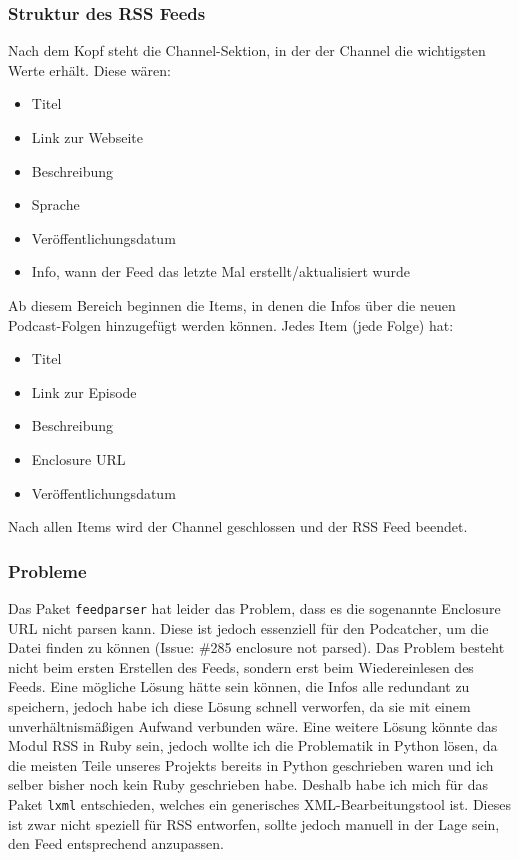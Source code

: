 \documentclass{article}
\begin{document}
\subsubsection{Struktur des RSS Feeds}
Nach dem Kopf steht die Channel-Sektion, in der der Channel die wichtigsten Werte erhält. Diese wären:
\begin{itemize}
    \item Titel
    \item Link zur Webseite
    \item Beschreibung
    \item Sprache
    \item Veröffentlichungsdatum
    \item Info, wann der Feed das letzte Mal erstellt/aktualisiert wurde
\end{itemize}

Ab diesem Bereich beginnen die Items, in denen die Infos über die neuen Podcast-Folgen hinzugefügt werden können. Jedes Item (jede Folge) hat:

\begin{itemize}
    \item Titel
    \item Link zur Episode
    \item Beschreibung
    \item Enclosure URL
    \item Veröffentlichungsdatum
\end{itemize}

Nach allen Items wird der Channel geschlossen und der RSS Feed beendet.

\subsubsection{Probleme}
Das Paket \texttt{feedparser} \cite{feedparser} hat leider das Problem, dass es die sogenannte Enclosure URL nicht parsen kann. Diese ist jedoch essenziell für den Podcatcher, um die Datei finden zu können (Issue: \#285 enclosure not parsed). Das Problem besteht nicht beim ersten Erstellen des Feeds, sondern erst beim Wiedereinlesen des Feeds. Eine mögliche Lösung hätte sein können, die Infos alle redundant zu speichern, jedoch habe ich diese Lösung schnell verworfen, da sie mit einem unverhältnismäßigen Aufwand verbunden wäre. Eine weitere Lösung könnte das Modul RSS in Ruby sein, jedoch wollte ich die Problematik in Python lösen, da die meisten Teile unseres Projekts bereits in Python geschrieben waren und ich selber bisher noch kein Ruby geschrieben habe.
Deshalb habe ich mich für das Paket \texttt{lxml} \cite{lxml} entschieden, welches ein generisches XML-Bearbeitungstool ist. Dieses ist zwar nicht speziell für RSS entworfen, sollte jedoch manuell in der Lage sein, den Feed entsprechend anzupassen.
\end{document}
